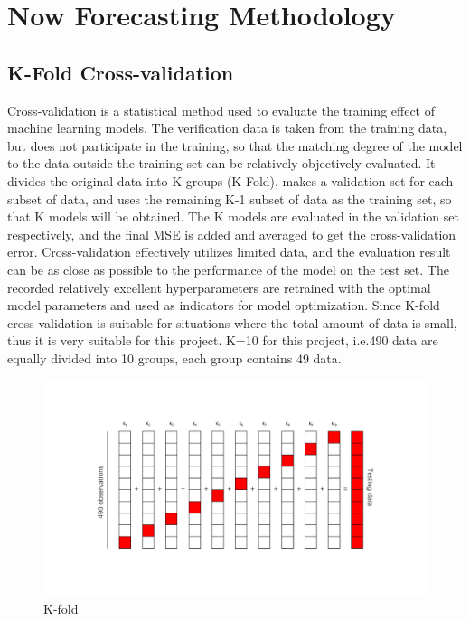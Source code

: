 \section{Now Forecasting Methodology} %

\subsection{K-Fold Cross-validation}
Cross-validation is a statistical method used to evaluate the training effect of machine learning models. The verification data is taken from the training data, but does not participate in the training, so that the matching degree of the model to the data outside the training set can be relatively objectively evaluated. It divides the original data into K groups (K-Fold), makes a validation set for each subset of data, and uses the remaining K-1 subset of data as the training set, so that K models will be obtained. The K models are evaluated in the validation set respectively, and the final MSE is added and averaged to get the cross-validation error. Cross-validation effectively utilizes limited data, and the evaluation result can be as close as possible to the performance of the model on the test set. The recorded relatively excellent hyperparameters are retrained with the optimal model parameters and used as indicators for model optimization\cite{browne2000cross}. Since K-fold cross-validation is suitable for situations where the total amount of data is small, thus it is very suitable for this project. K=10 for this project, i.e.490 data are equally divided into 10 groups, each group contains 49 data.

\begin{figure}[htbp]
    \center
    \includegraphics[scale=0.5]{Figure/3.5.1-K-Fold.pdf}
    \caption{K-fold}
\end{figure}


